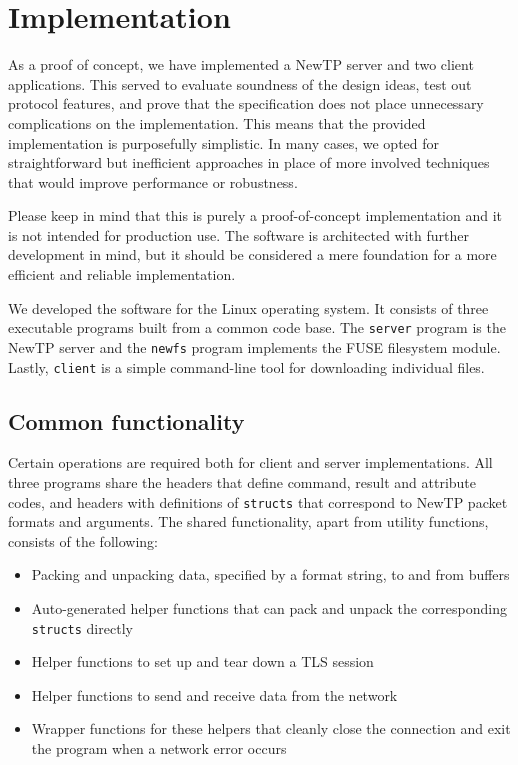 
\chapter{Implementation}

As a proof of concept, we have implemented a NewTP server and two client applications. This served to evaluate
soundness of the design ideas, test out protocol features, and prove that the specification does not place
unnecessary complications on the implementation. This means that the provided implementation is purposefully
simplistic. In many cases, we opted for straightforward but inefficient approaches in place of more involved
techniques that would improve performance or robustness.

Please keep in mind that this is purely a proof-of-concept implementation and it is not intended for production
use. The software is architected with further development in mind, but it should be considered a mere
foundation for a more efficient and reliable implementation.

We developed the software for the Linux operating system. It consists of three executable programs built from
a common code base. The {\tt server} program is the NewTP server and the {\tt newfs} program implements the
FUSE filesystem module. Lastly, {\tt client} is a simple command-line tool for downloading individual files.

\section{Common functionality}

Certain operations are required both for client and server implementations. All three programs share the
headers that define command, result and attribute codes, and headers with definitions of {\tt structs} that
correspond to NewTP packet formats and arguments. The shared functionality, apart from utility functions,
consists of the following:
\begin{itemize}[nolistsep]
	\item Packing and unpacking data, specified by a format string, to and from buffers
	\item Auto-generated helper functions that can pack and unpack the corresponding {\tt structs}
		directly
	\item Helper functions to set up and tear down a TLS session
	\item Helper functions to send and receive data from the network
	\item Wrapper functions for these helpers that cleanly close the connection and exit the program
		when a network error occurs
\end{itemize}

